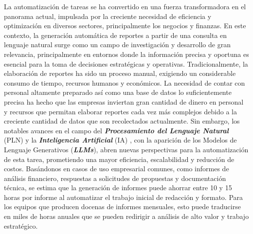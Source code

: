 La automatización de tareas se ha convertido en una fuerza transformadora en el panorama actual, impulsada por la creciente necesidad de eficiencia y optimización en diversos sectores, principalmente los negocios y finanzas. En este contexto, la generación automática de reportes a partir de una consulta en lenguaje natural surge como un campo de investigación y desarrollo de gran relevancia, principalmente en entornos donde la información precisa y oportuna es esencial para la toma de decisiones estratégicas y operativas.
Tradicionalmente, la elaboración de reportes ha sido un proceso manual, exigiendo un considerable consumo de tiempo, recursos humanos y económicos. La necesidad de contar con personal altamente preparado así como una base de datos lo suficientemente precisa ha hecho que las empresas inviertan gran cantidad de dinero en personal y recursos que permitan elaborar reportes cada vez más complejos debido a la creciente cantidad de datos que son recolectados actualmente. Sin embargo, los notables avances en el campo del \textit{\textbf{Procesamiento del Lenguaje Natural}} (PLN) y la \textit{\textbf{Inteligencia Artificial}} (IA) \cite{russell2016artificial}, con la aparición de los Modelos de Lenguaje Generativos (\textit{\textbf{LLMs}}), abren nuevas perspectivas para la automatización de esta tarea, prometiendo una mayor eficiencia, escalabilidad y reducción de costos.
Basándonos en casos de uso empresarial comunes, como informes de análisis financiero, respuestas a solicitudes de propuestas y documentación técnica, se estima que la generación de informes puede ahorrar entre 10 y 15 horas por informe al automatizar el trabajo inicial de redacción y formato. Para los equipos que producen docenas de informes mensuales, esto puede traducirse en miles de horas anuales que se pueden redirigir a análisis de alto valor y trabajo estratégico.

